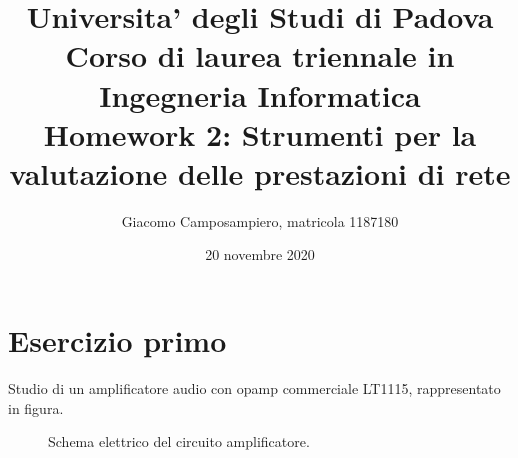 \documentclass[a4paper,10pt]{article}
\begin{document}
%

   
   \title{{\large Universita' degli Studi di Padova \\ } {\normalsize Corso di laurea triennale in Ingegneria Informatica}\\ \vspace{1.8cm} \textbf{ Homework 2: Strumenti per la valutazione delle prestazioni di rete}}

   \author{Giacomo Camposampiero, matricola 1187180}
          
   \date{20 novembre 2020}

   \maketitle
   
   \vspace{2.2cm}
   
   \renewcommand{\contentsname}{Indice}      
   \tableofcontents
   
   \newpage
  
\section{Esercizio primo}
Studio di un amplificatore audio con opamp commerciale LT1115, rappresentato in figura.
\begin{figure}[h!]
  	\centering
  	\caption{Schema elettrico del circuito amplificatore.}
  	\label{fig:ckt1}
\end{figure}
\end{document}
